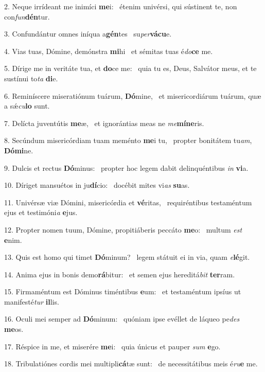 2. Neque irrídeant me inimíci \textbf{me}i: \ast\  étenim univérsi, qui sústinent te, non con\textit{fun}\textbf{dén}tur.\

3. Confundántur omnes iníqua a\textbf{gén}tes \ast\  su\textit{per}\textbf{vá}\textbf{cu}e.\

4. Vias tuas, Dómine, demónstra \textbf{mi}hi \ast\  et sémitas tuas é\textit{do}\textbf{ce} me.\

5. Dírige me in veritáte tua, et \textbf{do}ce me: \ast\  quia tu es, Deus, Salvátor meus, et te sustínui to\textit{ta} \textbf{di}e.\

6. Reminíscere miseratiónum tuárum, \textbf{Dó}mine, \ast\  et misericordiárum tuárum, quæ a sǽ\textit{cu}\textbf{lo} sunt.\

7. Delícta juventútis \textbf{me}æ, \ast\  et ignorántias meas ne \textit{me}\textbf{mí}\textbf{ne}ris.\

8. Secúndum misericórdiam tuam meménto \textbf{me}i tu, \ast\  propter bonitátem tu\textit{am}, \textbf{Dó}\textbf{mi}ne.\

9. Dulcis et rectus \textbf{Dó}minus: \ast\  propter hoc legem dabit delinquéntibus \textit{in} \textbf{vi}a.\

10. Díriget mansuétos in ju\textbf{dí}cio: \ast\  docébit mites vi\textit{as} \textbf{su}as.\

11. Univérsæ viæ Dómini, misericórdia et \textbf{vé}ritas, \ast\  requiréntibus testaméntum ejus et testimóni\textit{a} \textbf{e}jus.\

12. Propter nomen tuum, Dómine, propitiáberis peccáto \textbf{me}o: \ast\  multum \textit{est} \textbf{e}nim.\

13. Quis est homo qui timet \textbf{Dó}minum? \ast\  legem státuit ei in via, quam \textit{e}\textbf{lé}git.\

14. Anima ejus in bonis demo\textbf{rá}bitur: \ast\  et semen ejus hereditá\textit{bit} \textbf{ter}ram.\

15. Firmaméntum est Dóminus timéntibus \textbf{e}um: \ast\  et testaméntum ipsíus ut manifesté\textit{tur} \textbf{il}lis.\

16. Oculi mei semper ad \textbf{Dó}minum: \ast\  quóniam ipse evéllet de láqueo pe\textit{des} \textbf{me}os.\

17. Réspice in me, et miserére \textbf{me}i: \ast\  quia únicus et pauper \textit{sum} \textbf{e}go.\

18. Tribulatiónes cordis mei multipli\textbf{cá}tæ sunt: \ast\  de necessitátibus meis é\textit{ru}\textbf{e} me.\


